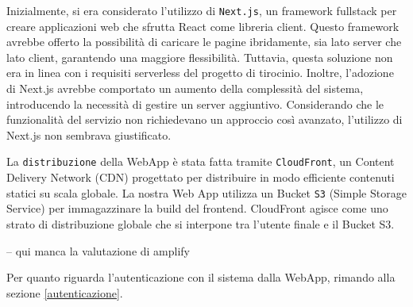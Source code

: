 Inizialmente, si era considerato l'utilizzo di \texttt{Next.js}, un framework fullstack per creare applicazioni web che sfrutta React come libreria client. Questo framework avrebbe offerto la possibilità di caricare le pagine ibridamente, sia lato server che lato client, garantendo una maggiore flessibilità. Tuttavia, questa soluzione non era in linea con i requisiti serverless del progetto di tirocinio. Inoltre, l'adozione di Next.js avrebbe comportato un aumento della complessità del sistema, introducendo la necessità di gestire un server aggiuntivo. Considerando che le funzionalità del servizio non richiedevano un approccio così avanzato, l'utilizzo di Next.js non sembrava giustificato.

\vspace{0,3cm}

La \texttt{distribuzione} della WebApp è stata fatta tramite \texttt{CloudFront}, un Content Delivery Network (CDN) progettato per distribuire in modo efficiente contenuti statici su scala globale.
La nostra Web App utilizza un Bucket \texttt{S3} (Simple Storage Service) per immagazzinare la build del frontend. CloudFront agisce come uno strato di distribuzione globale che si interpone tra l'utente finale e il Bucket S3. 

-- qui manca la valutazione di amplify


Per quanto riguarda l'autenticazione con il sistema dalla WebApp, rimando alla sezione \ref{autenticazione}.